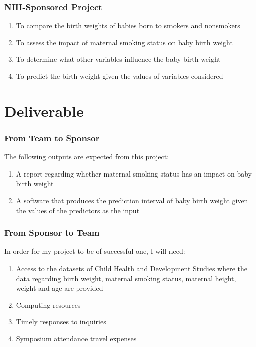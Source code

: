 \documentclass[compress,handout,10pt]{beamer}
\let\olditem\item
\renewcommand{\item}{\setlength{\itemsep}{0.5\baselineskip}\olditem}
\begin{document}
\begin{frame}
    \frametitle{NIH-Sponsored Project}
     \begin{enumerate}
         \item To compare the birth weights of babies born to smokers and nonsmokers
         \item To assess the impact of maternal smoking status on baby birth weight
         \item To determine what other variables influence the baby birth weight
         \item To predict the birth weight given the values of variables considered
     \end{enumerate}
\end{frame}

\section{Deliverable}

\begin{frame}
    \frametitle{From Team to Sponsor}
    The following outputs are expected from this project:
     \begin{enumerate}
         \item A report regarding whether maternal smoking status has an impact on baby birth weight
         \item A software that produces the prediction interval of baby birth weight given the values of the predictors as the input
     \end{enumerate}
\end{frame}

\begin{frame}
    \frametitle{From Sponsor to Team}
    In order for my project to be of successful one, I will need:
     \begin{enumerate}
         \item Access to the datasets of Child Health and Development Studies where the data regarding birth weight, maternal smoking status, maternal height, weight and age are provided
         \item Computing resources
         \item Timely responses to inquiries
         \item Symposium attendance travel expenses
     \end{enumerate}
\end{frame}
\end{document}
